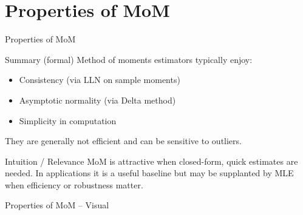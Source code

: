 \section{Properties of MoM}

\begin{frame}{Properties of MoM}
  \begin{block}{Summary (formal)}
    Method of moments estimators typically enjoy:
    \begin{itemize}
      \item Consistency (via LLN on sample moments)
      \item Asymptotic normality (via Delta method)
      \item Simplicity in computation
    \end{itemize}
    They are generally not efficient and can be sensitive to outliers.
  \end{block}

  \begin{block}{Intuition / Relevance}
    MoM is attractive when closed-form, quick estimates are needed. In
    applications it is a useful baseline but may be supplanted by MLE when
    efficiency or robustness matter.
  \end{block}

  \vspace{0.7em}
\end{frame}

\begin{frame}{Properties of MoM -- Visual}
  \begin{center}
    \begin{adjustbox}{max height=0.40\textheight}
    \end{adjustbox}
  \end{center}
\end{frame}